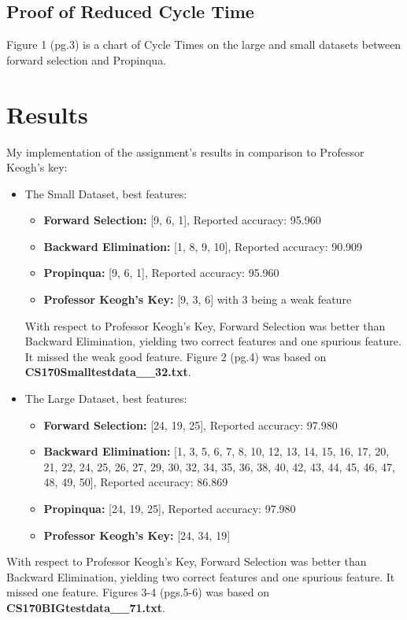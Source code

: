 \documentclass{article}
\begin{document}
\subsection{Proof of Reduced Cycle Time}

Figure 1 (pg.3) is a chart of Cycle Times on the large and small datasets between forward
selection and Propinqua.

\section{Results}

My implementation of the assignment's results in comparison to Professor Keogh's
key:
\begin{itemize}
  
\item The Small Dataset, best features:
  \begin{itemize}
  \item \textbf{Forward Selection:} [9, 6, 1], Reported accuracy: 95.960%
  \item \textbf{Backward Elimination:} [1, 8, 9, 10], Reported accuracy: 90.909%
  \item \textbf{Propinqua:} [9, 6, 1], Reported accuracy: 95.960%
  \item \textbf{Professor Keogh's Key:} [9, 3, 6] with 3 being a weak feature
  \end{itemize}
   With respect to Professor Keogh's Key, Forward Selection was better
   than Backward Elimination, yielding two correct features and one spurious
   feature. It missed the weak good feature. Figure 2 (pg.4) was based on
   \textbf{CS170Smalltestdata\_\_32.txt}. 
  
\item The Large Dataset, best features:
  \begin{itemize}
  \item \textbf{Forward Selection:} [24, 19, 25], Reported accuracy: 97.980%
  \item \textbf{Backward Elimination:} [1, 3, 5, 6, 7, 8, 10, 12, 13, 14, 15,
    16, 17, 20, 21, 22, 24, 25, 26, 27, 29, 30, 32, 34, 35, 36, 38, 40, 42, 43,
    44, 45, 46, 47, 48, 49, 50], Reported accuracy: 86.869%
  \item \textbf{Propinqua:} [24, 19, 25], Reported accuracy: 97.980%
  \item \textbf{Professor Keogh's Key:} [24, 34, 19]
    \end{itemize}
\end{itemize}
  With respect to Professor Keogh's Key, Forward Selection was better than
  Backward Elimination, yielding two correct features and one spurious feature.
  It missed one feature. Figures 3-4 (pgs.5-6) was based on
  \textbf{CS170BIGtestdata\_\_71.txt}. 
\end{document}
